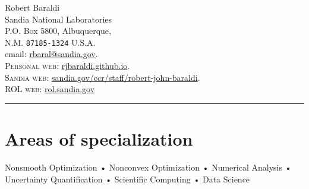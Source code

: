 \documentclass[11pt, a4paper]{article}
\begin{document}
{\LARGE Robert Baraldi}\\%
Sandia National Laboratories\\
P.O. Box 5800, Albuquerque,\\
N.M. \texttt{87185-1324}
U.S.A.\\
email: \href{mailto:rbaral@sandia.gov}{rbaral@sandia.gov}.\\
\textsc{Personal web}: \href{http://rjbaraldi.github.io}{rjbaraldi.github.io}.\\
\textsc{Sandia web}: \href{https://www.sandia.gov/ccr/staff/robert-john-baraldi/}{sandia.gov/ccr/staff/robert-john-baraldi}.\\
\textsc{ROL web}: \href{https://rol.sandia.gov/}{rol.sandia.gov}

\hrule
\section*{Areas of specialization}
Nonsmooth Optimization • Nonconvex Optimization • Numerical Analysis • Uncertainty Quantification • Scientific Computing • Data Science
\end{document}
